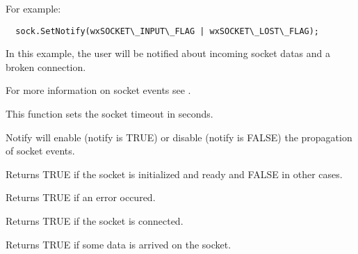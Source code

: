 \twocolwidtha{7cm}
\begin{twocollist}\itemsep=0pt
\end{twocollist}%

For example:
\begin{verbatim}
  sock.SetNotify(wxSOCKET\_INPUT\_FLAG | wxSOCKET\_LOST\_FLAG);
\end{verbatim}
In this example, the user will be notified about incoming socket datas and
a broken connection.

For more information on socket events see .

%
%


This function sets the socket timeout in seconds.

%
%
\label{wxsocketbasenotify}


Notify will enable (notify is TRUE) or disable (notify is FALSE) the propagation
of socket events.

% 
%

\label{wxsocketbaseok}


Returns TRUE if the socket is initialized and ready and FALSE in other
cases.

\label{wxsocketbaseerror}


Returns TRUE if an error occured.

\label{wxsocketbaseconnected}


Returns TRUE if the socket is connected.

\label{wxsocketbaseisdata}


Returns TRUE if some data is arrived on the socket. 

